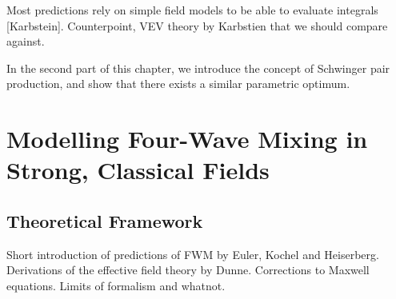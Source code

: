 \documentclass[11pt,SymmetricalJury]{inrsthesis/inrsthesis}
\begin{document}
Most predictions rely on simple field models to be able to evaluate integrals
[Karbstein]. Counterpoint, VEV theory by Karbstien that we should compare
against.

In the second part of this chapter, we introduce the concept of Schwinger pair
production, and show that there exists a similar parametric optimum.


\section{Modelling Four-Wave Mixing in Strong, Classical Fields}

\subsection{Theoretical Framework}

Short introduction of predictions of FWM by Euler, Kochel and Heiserberg.
Derivations of the effective field theory by Dunne. Corrections to Maxwell
equations. Limits of formalism and whatnot.
\end{document}
